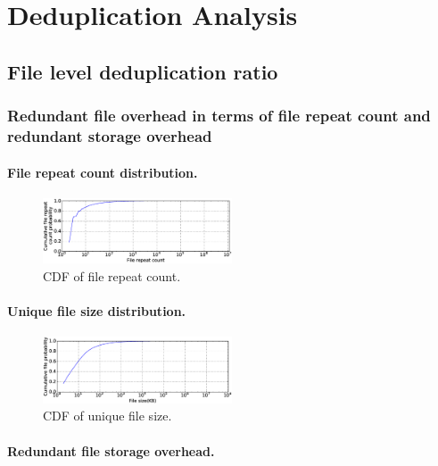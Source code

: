 \section{Deduplication Analysis}
\label{sec:dedup}

\subsection{File level deduplication ratio}

\subsubsection{Redundant file overhead in terms of file repeat count and redundant storage overhead}

\paragraph{File repeat count distribution.}

\begin{figure}
	\centering
	\includegraphics[width=0.5\textwidth]{graphs/File_repeat_count.eps}
	\caption{CDF of file repeat count.
	}
	\label{fig_file_repeat_count}
\end{figure}

\paragraph{Unique file size distribution.}

\begin{figure}
	\centering
	\includegraphics[width=0.5\textwidth]{graphs/File_size-KB.eps}
	\caption{CDF of unique file size.
	}
	\label{fig_file_size}
\end{figure}

\paragraph{Redundant file storage overhead.}

